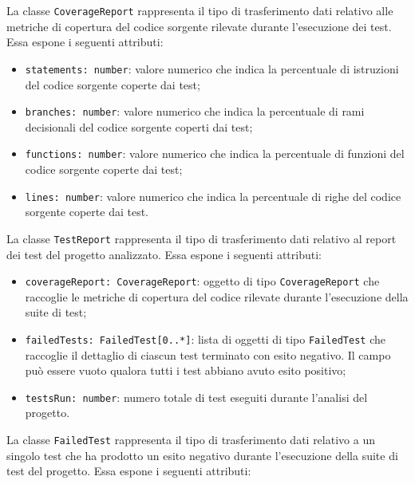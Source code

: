 \documentclass[a4paper, 11pt]{article}
\newcounter{subsubsubsection}[subsubsection]
\begin{document}
La classe \texttt{CoverageReport} rappresenta il tipo di trasferimento dati relativo alle metriche
di copertura del codice sorgente rilevate durante l'esecuzione dei test. Essa espone i seguenti
attributi:
 
\begin{itemize}
  \item \texttt{statements: number}: valore numerico che indica la percentuale di istruzioni del
    codice sorgente coperte dai test;
 
  \item \texttt{branches: number}: valore numerico che indica la percentuale di rami decisionali
    del codice sorgente coperti dai test;
 
  \item \texttt{functions: number}: valore numerico che indica la percentuale di funzioni del
    codice sorgente coperte dai test;
 
  \item \texttt{lines: number}: valore numerico che indica la percentuale di righe del codice
    sorgente coperte dai test.
\end{itemize}

\label{sec:TestReport}
 
La classe \texttt{TestReport} rappresenta il tipo di trasferimento dati relativo al report dei test
del progetto analizzato. Essa espone i seguenti attributi:
 
\begin{itemize}
  \item \texttt{coverageReport: CoverageReport}: oggetto di tipo \texttt{CoverageReport} che
    raccoglie le metriche di copertura del codice rilevate durante l'esecuzione della suite di test;
 
  \item \texttt{failedTests: FailedTest[0..*]}: lista di oggetti di tipo \texttt{FailedTest} che
    raccoglie il dettaglio di ciascun test terminato con esito negativo. Il campo può essere vuoto
    qualora tutti i test abbiano avuto esito positivo;
 
  \item \texttt{testsRun: number}: numero totale di test eseguiti durante
    l'analisi del progetto.
\end{itemize}


\label{sec:FailedTest}
 
La classe \texttt{FailedTest} rappresenta il tipo di trasferimento dati relativo a un singolo test
che ha prodotto un esito negativo durante l'esecuzione della suite di test del progetto. Essa espone
i seguenti attributi:
 
\end{document}
